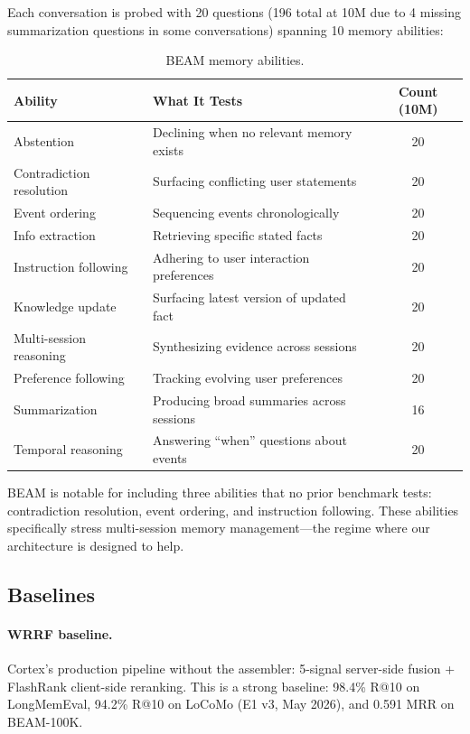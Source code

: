 \documentclass[11pt]{article}
\begin{document}
Each conversation is probed with 20 questions (196 total at 10M due
to 4 missing summarization questions in some conversations) spanning
10 memory abilities:

\begin{table}[h]
\centering
\caption{BEAM memory abilities.}
\label{tab:beam-abilities}
\small
\begin{tabular}{llc}
\toprule
Ability & What It Tests & Count (10M) \\
\midrule
Abstention & Declining when no relevant memory exists & 20 \\
Contradiction resolution & Surfacing conflicting user statements & 20 \\
Event ordering & Sequencing events chronologically & 20 \\
Info extraction & Retrieving specific stated facts & 20 \\
Instruction following & Adhering to user interaction preferences & 20 \\
Knowledge update & Surfacing latest version of updated fact & 20 \\
Multi-session reasoning & Synthesizing evidence across sessions & 20 \\
Preference following & Tracking evolving user preferences & 20 \\
Summarization & Producing broad summaries across sessions & 16 \\
Temporal reasoning & Answering ``when'' questions about events & 20 \\
\bottomrule
\end{tabular}
\end{table}

BEAM is notable for including three abilities that no prior benchmark
tests: contradiction resolution, event ordering, and instruction
following.  These abilities specifically stress multi-session memory
management---the regime where our architecture is designed to help.

\subsection{Baselines}
\label{sec:baselines}

\paragraph{WRRF baseline.}
Cortex's production pipeline without the assembler: 5-signal
server-side fusion + FlashRank client-side reranking.  This is a
strong baseline: 98.4\% R@10 on LongMemEval, 94.2\% R@10 on LoCoMo
(E1 v3, May 2026), and 0.591 MRR on BEAM-100K.
\end{document}
